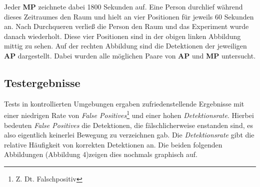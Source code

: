 Jeder \textbf{MP} zeichnete dabei 1800 Sekunden auf. Eine Person durchlief während dieses Zeitraumes den Raum und hielt an vier Positionen für jeweils 60 Sekunden an. Nach Durchqueren verließ die Person den Raum und das Experiment wurde danach wiederholt. Diese vier Positionen sind in der obigen linken Abbildung mittig zu sehen. Auf der rechten Abbildung sind die Detektionen der jeweiligen \textbf{AP} dargestellt. Dabei wurden alle möglichen Paare von \textbf{AP} und \textbf{MP} untersucht.

\subsection{Testergebnisse}
 Tests in kontrollierten Umgebungen ergaben zufriedenstellende Ergebnisse mit einer niedrigen Rate von \textit{False Positives}\footnote{Z. Dt. Falschpositiv} und einer hohen \textit{Detektionsrate}. Hierbei bedeuten \textit{False Positives} die Detektionen, die fälschlicherweise enstanden sind, es also eigentlich keinerlei Bewegung zu verzeichnen gab. Die \textit{Detektionsrate} gibt die relative Häufigkeit von korrekten Detektionen an. Die beiden folgenden Abbildungen (Abbildung 4)zeigen dies nochmals graphisch auf.

